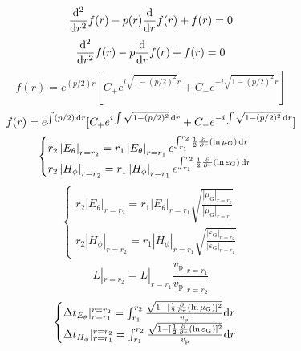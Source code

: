 \begin{equation}
    \frac{\mathrm{d}^2}{\mathrm{d} r^2}f(r)-p(r)\frac{\mathrm{d}}{\mathrm{d} r}f(r)+f(r)=0
\end{equation}
\begin{equation}
    \frac{\mathrm{d}^2}{\mathrm{d} r^2}f(r)-p\frac{\mathrm{d}}{\mathrm{d} r}f(r)+f(r)=0
\end{equation}
\begin{equation}
    f(r)=e^{(p/2)r}[C_+e^{i\sqrt{1-(p/2)^2}r}+C_-e^{-i\sqrt{1-(p/2)^2}r}]
\end{equation}
\begin{equation}
    f(r)=e^{\int(p/2)\,\mathrm{d} r}[C_+e^{i\int\sqrt{1-(p/2)^2}\,\mathrm{d} r}+C_-e^{-i\int\sqrt{1-(p/2)^2}\,\mathrm{d} r}]
\end{equation}
\begin{equation}
    \begin{cases}
        r_2\left\lvert {E}_\theta\right\rvert_{r=r_2}=r_1\left\lvert {E}_\theta\right\rvert_{r=r_1}e^{\int_{r_1}^{r_2}\frac{1}{2}\frac{\partial}{\partial r}(\ln\mu_{\text{G}})\,\mathrm{d} r}\\
        r_2\left\lvert {H}_\phi\right\rvert_{r=r_2}=r_1\left\lvert {H}_\phi\right\rvert_{r=r_1}e^{\int_{r_1}^{r_2}\frac{1}{2}\frac{\partial}{\partial r}(\ln\varepsilon_{\text{G}})\,\mathrm{d} r}
    \end{cases}
\end{equation}
\begin{equation}
    \begin{cases}
        r_2\left\lvert {E}_\theta\right\rvert_{r=r_2}=r_1\left\lvert {E}_\theta\right\rvert_{r=r_1}\sqrt{\frac{\left\lvert \mu_{\text{G}}\right\rvert_{r=r_2}}{\left\lvert \mu_{\text{G}}\right\rvert_{r=r_1}}}\\
        r_2\left\lvert {H}_\phi\right\rvert_{r=r_2}=r_1\left\lvert {H}_\phi\right\rvert_{r=r_1}\sqrt{\frac{\left\lvert \varepsilon_{\text{G}}\right\rvert_{r=r_2}}{\left\lvert \varepsilon_{\text{G}}\right\rvert_{r=r_1}}}
    \end{cases}
\end{equation}
\begin{equation}
    L|_{r=r_2}=L|_{r=r_1}\frac{v_\text{p}|_{r=r_1}}{v_\text{p}|_{r=r_2}}
\end{equation}
\begin{equation}
    \begin{cases}
        \Delta t_{{E}_\theta}|_{r=r_1}^{r=r_2}=\int_{r_1}^{r_2}\frac{\sqrt{1-[\frac{1}{2}\frac{\partial}{\partial r}(\ln\mu_{\text{G}})]^2}}{v_\text{p}}\mathrm{d} r\\
        \Delta t_{{H}_\phi}|_{r=r_1}^{r=r_2}=\int_{r_1}^{r_2}\frac{\sqrt{1-[\frac{1}{2}\frac{\partial}{\partial r}(\ln\varepsilon_{\text{G}})]^2}}{v_\text{p}}\mathrm{d} r\\
    \end{cases}
\end{equation}

